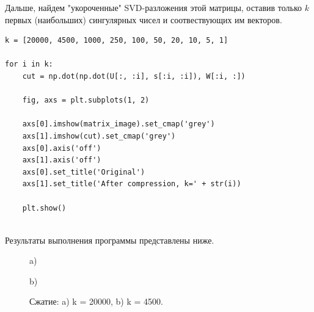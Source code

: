 \documentclass[a5paper, 10pt]{article}
\theoremstyle{definition}
\theoremstyle{plain}
\theoremstyle{remark}
\begin{document}
Дальше, найдем "укороченные"  SVD-разложения этой матрицы, оставив только $k$ первых (наибольших) сингулярных чисел и соотвествующих им векторов. 
\begin{center}
\begin{lstlisting}[label=some-code,caption={Фрагмент кода для нахождения "укороченных"  SVD-разложений и отрисовки результата}]
k = [20000, 4500, 1000, 250, 100, 50, 20, 10, 5, 1]

for i in k:
    cut = np.dot(np.dot(U[:, :i], s[:i, :i]), W[:i, :])

    fig, axs = plt.subplots(1, 2)

    axs[0].imshow(matrix_image).set_cmap('grey')
    axs[1].imshow(cut).set_cmap('grey')
    axs[0].axis('off')
    axs[1].axis('off')
    axs[0].set_title('Original')
    axs[1].set_title('After compression, k=' + str(i))

    plt.show()


\end{lstlisting}
\end{center}

Результаты выполнения программы представлены ниже.

\begin{figure}[h]
\begin{minipage}[h]{1\linewidth}
 a) \\
\end{minipage}
\begin{minipage}[h]{1\linewidth}
 b) \\
\end{minipage}
\caption{Сжатие: a) k = 20000, b) k = 4500.}
\end{figure}
\end{document}
